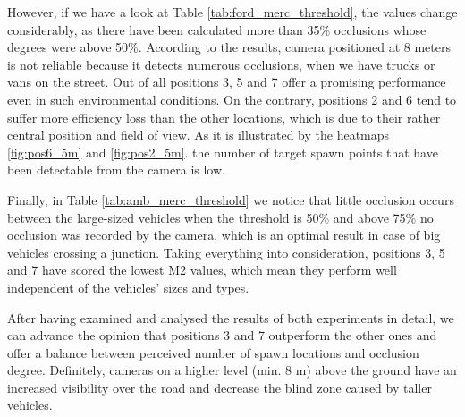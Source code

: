 However, if we have a look at Table \ref{tab:ford_merc_threshold}, the values change considerably, as there have been calculated more than 35\% occlusions whose degrees were above 50\%. According to the results, camera positioned at 8 meters is not reliable because it detects numerous occlusions, when we have trucks or vans on the street. Out of all positions 3, 5 and 7 offer a promising performance even in such environmental conditions. On the contrary, positions 2 and 6 tend to suffer more efficiency loss than the other locations, which is due to their rather central position and field of view. As it is illustrated by the heatmaps \ref{fig:pos6_5m} and \ref{fig:pos2_5m}. the number of target spawn points that have been detectable from the camera is low.

Finally, in Table \ref{tab:amb_merc_threshold} we notice that little occlusion occurs between the large-sized vehicles when the threshold is 50\% and above 75\% no occlusion was recorded by the camera, which is an optimal result in case of big vehicles crossing a junction. Taking everything into consideration, positions 3, 5 and 7 have scored the lowest M2 values, which mean they perform well independent of the vehicles' sizes and types.

After having examined and analysed the results of both experiments in detail, we can advance the opinion that positions 3 and 7 outperform the other ones and offer a balance between perceived number of spawn locations and occlusion degree. Definitely, cameras on a higher level (min. 8 m) above the ground have an increased visibility over the road and decrease the blind zone caused by taller vehicles. 

